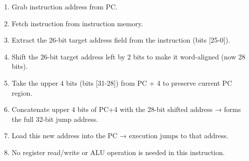 \vspace{1em}
\begin{enumerate}
   \item	Grab instruction address from PC.
   \item	Fetch instruction from instruction memory.
   \item	Extract the 26-bit target address field from the instruction (bits [25-0]).
   \item	Shift the 26-bit target address left by 2 bits to make it word-aligned (now 28 bits).
   \item	Take the upper 4 bits (bits [31-28]) from PC + 4 to preserve current PC region.
   \item	Concatenate upper 4 bits of PC+4 with the 28-bit shifted address → forms the full 32-bit jump address.
   \item	Load this new address into the PC → execution jumps to that address.
   \item	No register read/write or ALU operation is needed in this instruction.
\end{enumerate}